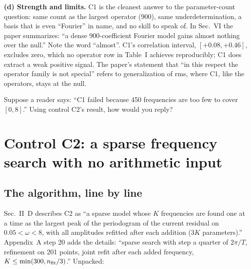 \textbf{(d) Strength and limits.} C1 is the cleanest answer to the parameter-count question: same count as the largest operator (900), same underdetermination, a basis that is even ``Fourier'' in name, and no skill to speak of. In Sec.~VI the paper summarizes: ``a dense 900-coefficient Fourier model gains almost nothing over the null.'' Note the word ``almost''. C1's correlation interval, $[+0.08,+0.46]$, excludes zero, which no operator row in Table~I achieves reproducibly; C1 does extract a weak positive signal. The paper's statement that ``in this respect the operator family is not special'' refers to generalization of rms, where C1, like the operators, stays at the null.

\begin{checkpoint}
Suppose a reader says: ``C1 failed because 450 frequencies are too few to cover $[0,8]$.'' Using control C2's result, how would you reply?
\end{checkpoint}

\section{Control C2: a sparse frequency search with no arithmetic input}\label{sec:paper-arithmetic-C2}

\subsection{The algorithm, line by line}

Sec.~II~D describes C2 as ``a sparse model whose $K$ frequencies are found one at a time as the largest peak of the periodogram of the current residual on $0.05<\omega<8$, with all amplitudes refitted after each addition ($3K$ parameters).'' Appendix~A step 20 adds the details: ``sparse search with step a quarter of $2\pi/T$, refinement on 201 points, joint refit after each added frequency, $K\le\min(300,n_{\rm fit}/3)$.'' Unpacked:

